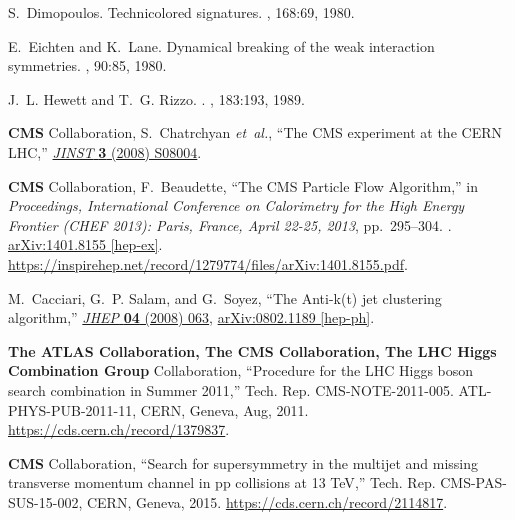 \begin{thebibliography}{99}
S.~Dimopoulos.
\newblock Technicolored signatures.
, 168:69, 1980.


E.~Eichten and K.~Lane.
\newblock Dynamical breaking of the weak interaction symmetries.
, 90:85, 1980.


J.~L. Hewett and T.~G. Rizzo.
.
, 183:193, 1989.







{\bfseries CMS} Collaboration, S.~Chatrchyan {\em et~al.}, ``{The CMS
  experiment at the CERN LHC},''
\href{http://dx.doi.org/10.1088/1748-0221/3/08/S08004}{{\em JINST} {\bfseries
  3} (2008) S08004}.

{\bfseries CMS} Collaboration, F.~Beaudette, ``{The CMS Particle Flow
  Algorithm},'' in {\em {Proceedings, International Conference on Calorimetry
  for the High Energy Frontier (CHEF 2013): Paris, France, April 22-25, 2013}},
  pp.~295--304.
.
\newblock \href{http://arxiv.org/abs/1401.8155}{{\ttfamily arXiv:1401.8155
  [hep-ex]}}.
\newblock
\url{https://inspirehep.net/record/1279774/files/arXiv:1401.8155.pdf}.
\newblock

M.~Cacciari, G.~P. Salam, and G.~Soyez, ``{The Anti-k(t) jet clustering
  algorithm},'' \href{http://dx.doi.org/10.1088/1126-6708/2008/04/063}{{\em
  JHEP} {\bfseries 04} (2008) 063},
\href{http://arxiv.org/abs/0802.1189}{{\ttfamily arXiv:0802.1189 [hep-ph]}}.

{\bfseries The ATLAS Collaboration, The CMS Collaboration, The LHC Higgs
  Combination Group} Collaboration, ``{Procedure for the LHC Higgs boson search
  combination in Summer 2011},'' Tech. Rep. CMS-NOTE-2011-005.
  ATL-PHYS-PUB-2011-11, CERN, Geneva, Aug, 2011.
\newblock \url{https://cds.cern.ch/record/1379837}.

{\bfseries CMS} Collaboration, ``{Search for supersymmetry in the multijet and
  missing transverse momentum channel in pp collisions at 13 TeV},'' Tech. Rep.
  CMS-PAS-SUS-15-002, CERN, Geneva, 2015.
\newblock \url{https://cds.cern.ch/record/2114817}.


\end{thebibliography}
